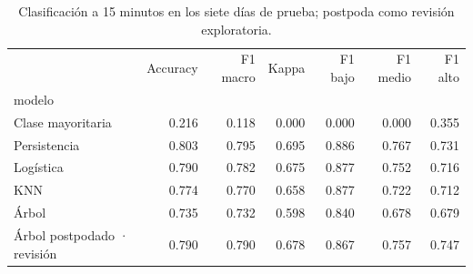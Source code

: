 \begin{table}
\caption{Clasificación a 15 minutos en los siete días de prueba; postpoda como revisión exploratoria.}
\label{tab:resultados}
\begin{tabular}{lrrrrrr}
\toprule
 & Accuracy & F1 macro & Kappa & F1 bajo & F1 medio & F1 alto \\
modelo &  &  &  &  &  &  \\
\midrule
Clase mayoritaria & 0.216 & 0.118 & 0.000 & 0.000 & 0.000 & 0.355 \\
Persistencia & 0.803 & 0.795 & 0.695 & 0.886 & 0.767 & 0.731 \\
Logística & 0.790 & 0.782 & 0.675 & 0.877 & 0.752 & 0.716 \\
KNN & 0.774 & 0.770 & 0.658 & 0.877 & 0.722 & 0.712 \\
Árbol & 0.735 & 0.732 & 0.598 & 0.840 & 0.678 & 0.679 \\
Árbol postpodado · revisión & 0.790 & 0.790 & 0.678 & 0.867 & 0.757 & 0.747 \\
\bottomrule
\end{tabular}
\end{table}

